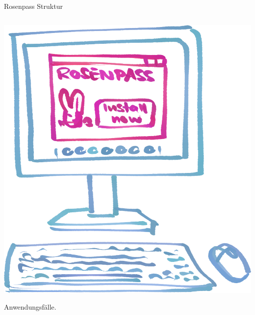 \documentclass{rosenpass-beamer}
\newcommand*{\imgNote}[1]{\begin{center}\setlength{\parskip}{0pt}\tiny\raggedright#1\end{center}}
\begin{document}
\begin{frame}{Rosenpass Struktur}
\begin{columns}[c]
\begin{column}{0.2\textwidth}
\medskip
\includegraphics[width=\linewidth]{graphics/Illu-install.png}

\imgNote{Anwendungsfälle.}
\end{column}
\end{columns}
\end{frame}
\end{document}

